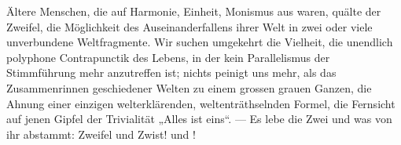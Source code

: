 Ältere Menschen, die auf Harmonie, Einheit, Monismus aus waren, quälte der Zweifel, die Möglichkeit des Auseinanderfallens ihrer Welt in zwei oder viele unverbundene Weltfragmente. Wir suchen umgekehrt die Vielheit, die unendlich polyphone Contrapunctik des Lebens, in der kein Parallelismus der Stimmführung mehr anzutreffen ist; nichts peinigt uns mehr, als das Zusammenrinnen geschiedener Welten zu einem grossen grauen Ganzen, die Ahnung einer einzigen welterklärenden, weltenträthselnden Formel, die Fernsicht auf jenen Gipfel der Trivialität „Alles ist eins“. — Es lebe die Zwei und was von ihr abstammt: Zweifel und Zwist!  und !
\par

